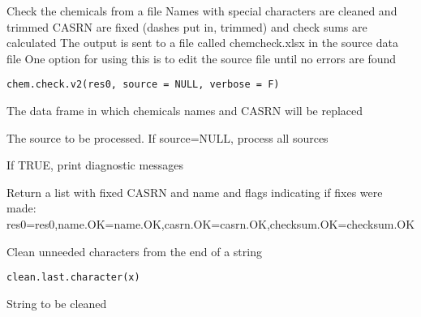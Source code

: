 \documentclass[letterpaper]{book}
\begin{document}
%
\begin{Description}\relax
Check the chemicals from a file
Names with special characters are cleaned and trimmed
CASRN are fixed (dashes put in, trimmed) and check sums are calculated
The output is sent to a file called chemcheck.xlsx in the source data file
One option for using this is to edit the source file until no errors are found
\end{Description}
%
\begin{Usage}
\begin{verbatim}
chem.check.v2(res0, source = NULL, verbose = F)
\end{verbatim}
\end{Usage}
%
\begin{Arguments}
\begin{ldescription}
\item[\code{res0}] The data frame in which chemicals names and CASRN will be replaced

\item[\code{source}] The source to be processed. If source=NULL, process all sources

\item[\code{verbose}] If TRUE, print diagnostic messages
\end{ldescription}
\end{Arguments}
%
\begin{Value}
Return a list with fixed CASRN and name and flags indicating if fixes were made:
res0=res0,name.OK=name.OK,casrn.OK=casrn.OK,checksum.OK=checksum.OK
\end{Value}
%
\begin{Description}\relax
Clean unneeded characters from the end of a string
\end{Description}
%
\begin{Usage}
\begin{verbatim}
clean.last.character(x)
\end{verbatim}
\end{Usage}
%
\begin{Arguments}
\begin{ldescription}
\item[\code{x}] String to be cleaned
\end{ldescription}
\end{Arguments}
\end{document}

